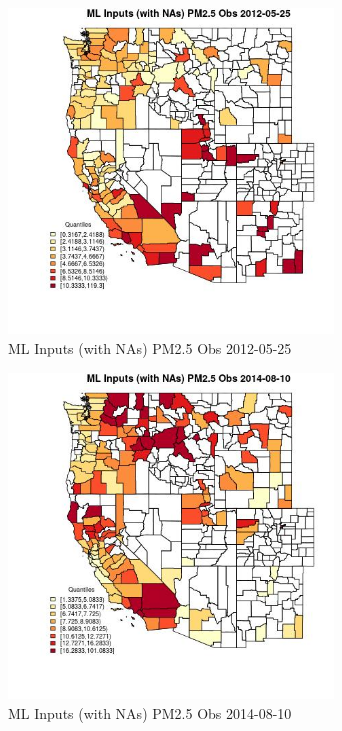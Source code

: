 \begin{figure} 
\centering  
\includegraphics[width=0.77\textwidth]{Code_Outputs/Report_ML_input_PM25_Step4_part_e_de_duplicated_aves_compiled_2019-05-18wNAs_CountyPM25_ObsMean2012-05-25_2012-05-25.jpg} 
\caption{\label{fig:Report_ML_input_PM25_Step4_part_e_de_duplicated_aves_compiled_2019-05-18wNAsCountyPM25_ObsMean2012-05-25_2012-05-25}ML Inputs (with NAs) PM2.5 Obs 2012-05-25} 
\end{figure} 
 

\begin{figure} 
\centering  
\includegraphics[width=0.77\textwidth]{Code_Outputs/Report_ML_input_PM25_Step4_part_e_de_duplicated_aves_compiled_2019-05-18wNAs_CountyPM25_ObsMean2014-08-10_2014-08-10.jpg} 
\caption{\label{fig:Report_ML_input_PM25_Step4_part_e_de_duplicated_aves_compiled_2019-05-18wNAsCountyPM25_ObsMean2014-08-10_2014-08-10}ML Inputs (with NAs) PM2.5 Obs 2014-08-10} 
\end{figure} 
 

